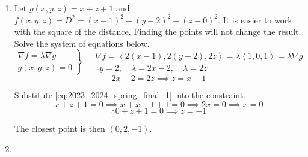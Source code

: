 \documentclass[a4paper, 12pt]{article}
\begin{document}
\begin{enumerate}[leftmargin=*,label=\textbf{\arabic*.}]
\item Let $g(x,y,z)=x+z+1$ and $f(x,y,z)=D^2=(x-1)^2+(y-2)^2+(z-0)^2$. It is easier to work with the square of the distance. Finding the points will not change the result. Solve the system of equations below.
\[
\left.
\begin{array}{l}
\displaystyle\nabla f=\lambda\nabla g \\
\displaystyle g(x,y,z)=0
\end{array}
\right\}\quad
\begin{array}{l}
\nabla f=\left\langle2(x-1),2(y-2),2z\right\rangle=\lambda\left\langle1,0,1\right\rangle=\lambda\nabla g\\\therefore y=2, \quad\lambda=2x-2,\quad\lambda=2z
\end{array}
\]
\begin{equation}2x-2=2z\implies z=x-1\label{eq:2023_2024_spring_final_1}\end{equation}

Substitute \eqref{eq:2023_2024_spring_final_1} into the constraint.
\[x+z+1=0\implies x+x-1+1=0\implies2x=0\implies x=0\]
\[\therefore 0+z+1=0\implies z=-1\]

The closest point is then $\boxed{(0,2,-1)}$.

\item\leavevmode
\vspace{-2em}
\begin{center}
\begin{minipage}{0.6\textwidth}
\end{minipage}
\end{center}
\end{enumerate}
\end{document}
